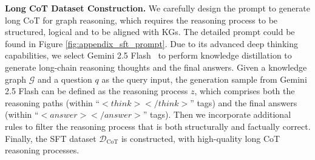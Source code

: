 
\textbf{Long CoT Dataset Construction.} We carefully design the prompt to generate long CoT for graph reasoning, 
which requires the reasoning process to be structured, logical and to be aligned with KGs. The detailed prompt could be found in Figure \ref{fig:appendix_sft_prompt}.
Due to its advanced deep thinking capabilities, we select Gemini 2.5 Flash~\citep{comanici2025gemini} to perform knowledge distillation to generate long-chain reasoning thoughts and the final answers.
Given a knowledge graph $\mathcal{G}$ and a question $q$ as the query input, the generation sample from Gemini 2.5 Flash can be defined as the reasoning process $z$, which comprises both the reasoning paths (within ``$<think></think>$'' tags) and the final answers (within ``$<answer></answer>$'' tags).
Then we incorporate additional rules to filter the reasoning process that is both structurally and factually correct.
Finally, the SFT dataset $\mathcal{D}_\textrm{CoT}$ is constructed, with high-quality long CoT reasoning processes.


